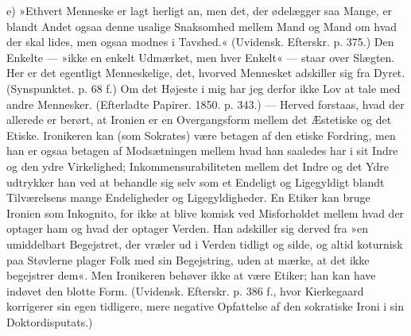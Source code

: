 \documentclass[12pt,a4paper,openany]{book}
\newcommand{\opage}[1]{\marginnote{\footnotesize\textit{[#1]}}}
\begin{document}
e) »Ethvert Menneske er lagt herligt an, men det,
der ødelægger saa Mange, er blandt Andet ogsaa denne
usalige Snaksomhed mellem Mand og Mand om hvad der
skal lides, men ogsaa modnes i Tavshed.« (Uvidensk.
Efterskr. p. 375.) Den Enkelte --- »ikke en enkelt Udmærket,
men hver Enkelt« --- staar over Slægten. Her
er det egentligt Menneskelige, det, hvorved Mennesket
adskiller sig fra Dyret. (Synspunktet. p. 68 f.) Om det
Højeste i mig har jeg derfor ikke Lov at tale med andre
Mennesker. (Efterladte Papirer. 1850. p. 343.) --- Herved
forstaas, hvad der allerede er berørt, at Ironien er en
Overgangsform mellem det Æstetiske og det Etiske.
Ironikeren kan (som Sokrates) være betagen af den etiske
Fordring, men han er ogsaa betagen af Modsætningen
mellem hvad han saaledes har i sit Indre og den ydre
Virkelighed; Inkommensurabiliteten mellem det Indre og
det Ydre udtrykker han ved at behandle sig selv som et
\opage{102}Endeligt og Ligegyldigt blandt Tilværelsens mange Endeligheder
og Ligegyldigheder. En Etiker kan bruge Ironien
som Inkognito, for ikke at blive komisk ved Misforholdet
mellem hvad der optager ham og hvad der optager
Verden. Han adskiller sig derved fra »en umiddelbart
Begejstret, der vræler ud i Verden tidligt og silde, og
altid koturnisk paa Støvlerne plager Folk med sin Begejstring,
uden at mærke, at det ikke begejstrer dem«.
Men Ironikeren behøver ikke at være Etiker; han kan
have indøvet den blotte Form. (Uvidensk. Efterskr. p. 386 f.,
hvor Kierkegaard korrigerer sin egen tidligere, mere
negative Opfattelse af den sokratiske Ironi i sin Doktordisputats.)
\end{document}
